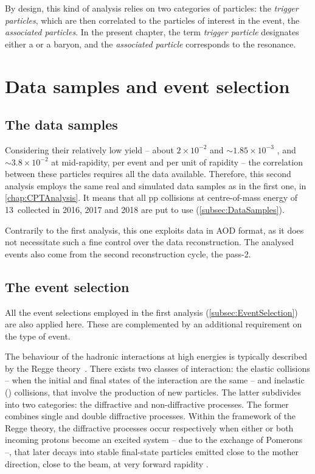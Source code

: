 By design, this kind of analysis relies on two categories of particles: the \textit{trigger particles}, which are then correlated to the particles of interest in the event, the \textit{associated particles}. In the present chapter, the term \textit{trigger particle} designates either a \rmXi or a \rmOmega baryon, and the \textit{associated particle} corresponds to the \rmPhiMes resonance.

\newpage

\section{Data samples and event selection}
\label{sec:DataSamplesCorrelation}

\subsection{The data samples}

Considering their relatively low yield -- about $ 2 \times 10^{-2}$ \rmXi and $\sim 1.85 \times 10^{-3}$ \rmOmega, and $\sim 3.8 \times 10^{-2}$ \rmPhiMes at mid-rapidity, per event and per unit of rapidity \cite{alicecollaborationProductionLightflavorHadrons2021} -- the correlation between these particles requires all the data available. Therefore, this second analysis employs the same real and simulated data samples as in the first one, in \chap\ref{chap:CPTAnalysis}. It means that all pp collisions at centre-of-mass energy of 13~\tev collected in 2016, 2017 and 2018 are put to use (\Sec\ref{subsec:DataSamples}). 

Contrarily to the first analysis, this one exploits data in AOD format, as it does not necessitate such a fine control over the data reconstruction. The analysed events also come from the second reconstruction cycle, the pass-2.

\subsection{The event selection}

All the event selections employed in the first analysis (\Sec\ref{subsec:EventSelection}) are also applied here. These are complemented by an additional requirement on the type of event.

The behaviour of the hadronic interactions at high energies is typically described by the Regge theory~\cite{collinsIntroductionReggeTheory1977}. There exists two classes of interaction: the elastic collisions -- when the initial and final states of the interaction are the same -- and inelastic (\INEL) collisions, that involve the production of new particles. The latter subdivides into two categories: the diffractive and non-diffractive processes. The former combines single and double diffractive processes. Within the framework of the Regge theory, the diffractive processes occur respectively when either or both incoming protons become an excited system -- due to the exchange of Pomerons --, that later decays into stable final-state particles emitted close to the mother direction, \ie close to the beam, at very forward rapidity \cite{alicecollaborationMeasurementInelasticSingle2013}.

